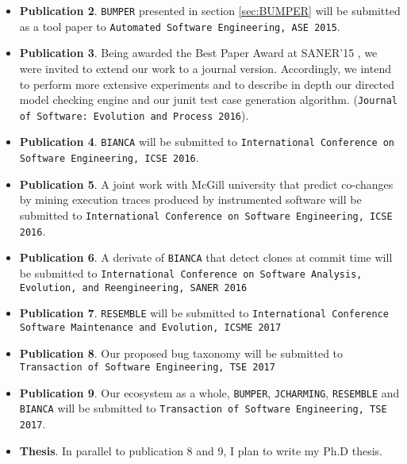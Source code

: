 \begin{itemize}
	\item {\bf Publication 2}. {\tt BUMPER} presented in section \ref{sec:BUMPER} will be submitted  as a tool paper to {\tt Automated Software Engineering, ASE 2015}.
	\item {\bf Publication 3}. Being awarded the Best Paper Award at SANER'15 \cite{Nayrolles2015}, we were invited to extend our work to a journal version. Accordingly, we intend to perform more extensive experiments and to describe in depth our directed model checking engine and our junit test case generation algorithm. ({\tt Journal of Software: Evolution and Process 2016}).
	\item {\bf Publication 4}. {\tt BIANCA} will be submitted to {\tt International Conference on Software Engineering, ICSE 2016}.
	\item {\bf Publication 5}. A joint work with McGill university that predict co-changes by mining execution traces produced by instrumented software will be submitted to {\tt International Conference on Software Engineering, ICSE 2016}.
	\item {\bf Publication 6}. A derivate of {\tt BIANCA} that detect clones at commit time will be submitted to {\tt International Conference on Software Analysis, Evolution, and Reengineering, SANER 2016}
	\item {\bf Publication 7}. {\tt RESEMBLE} will be submitted to {\tt International Conference Software Maintenance and Evolution, ICSME 2017}
	\item {\bf Publication 8}. Our proposed bug taxonomy will be submitted to {\tt Transaction of Software Engineering, TSE 2017}
	\item {\bf Publication 9}. Our ecosystem as a whole, {\tt BUMPER}, {\tt JCHARMING}, {\tt RESEMBLE} and {\tt BIANCA} will be submitted to {\tt Transaction of Software Engineering, TSE 2017}.
	\item {\bf Thesis}. In parallel to publication 8 and 9, I plan to write my Ph.D thesis.
\end{itemize}

